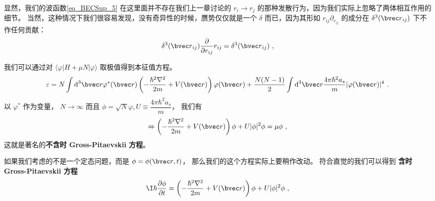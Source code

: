 显然，我们的波函数\autoref{eq_BECSup_5} 在这里面并不存在我们上一章讨论的 $r_i\to r_j$ 的那种发散行为，因为我们实际上忽略了两体相互作用的细节。 当然，这种情况下我们很容易发现，没有奇异性的时候，赝势仅仅就是一个 $\delta$ 而已，因为其形如 $r_{ij}\partial_{r_{ij}}$ 的成分在 $\delta^3({\bvec r}_{ij})$ 下不作任何贡献：
\begin{equation}
\delta^3({\bvec r}_{ij})\frac{\partial}{\partial r_{ij}}r_{ij} = \delta^3({\bvec r}_{ij})~,
\end{equation}

我们可以通过对 $\langle \varphi|H+\mu N|\varphi\rangle$ 取极值得到本征值方程。
\begin{equation}
\varepsilon = N\int \text{d}^3{\bvec r}\varphi^*({\bvec r})\left(-\frac{\hbar^2\nabla^2}{2m}+V({\bvec r})\right)\varphi({\bvec r})+\frac{N(N-1)}{2}\int \text{d}^3{\bvec r}\frac{4\pi\hbar^2a_s}{m}|\varphi({\bvec r})|^4~.
\end{equation}
以 $\varphi^*$ 作为变量， $N\to\infty$ 而且 $\phi = \sqrt{N}\varphi, U\equiv \dfrac{4\pi\hbar^2a_s}{m}$， 我们有
\begin{equation}
\Rightarrow \left(-\frac{\hbar^2\nabla^2}{2m}+V({\bvec r})\right)\phi + U|\phi|^2\phi = \mu\phi~,
\end{equation}
这就是著名的\textbf{不含时 Gross-Pitaevskii 方程}。

如果我们考虑的不是一个定态问题，而是 $\phi = \phi({\bvec r},t)$， 那么我们的这个方程实际上要稍作改动。 符合直觉的我们可以得到 \textbf{含时 Gross-Pitaevskii 方程}
\begin{equation}\label{eq_BECSup_10}
\I\hbar\frac{\partial\phi}{\partial t} = \left(-\frac{\hbar^2\nabla^2}{2m}+V({\bvec r})\right)\phi + U|\phi|^2\phi~,
\end{equation}


